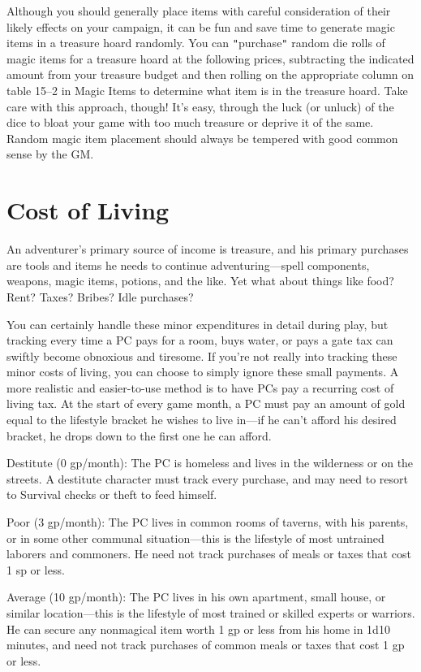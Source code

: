 				
Although you should generally place items with careful consideration of their likely effects on your campaign, it can be fun and save time to generate magic items in a treasure hoard randomly. You can \texttt{{}"{}}purchase\texttt{{}"{}} random die rolls of magic items for a treasure hoard at the following prices, subtracting the indicated amount from your treasure budget and then rolling on the appropriate column on table 15--2 in Magic Items to determine what item is in the treasure hoard. Take care with this approach, though! It's easy, through the luck (or unluck) of the dice to bloat your game with too much treasure or deprive it of the same. Random magic item placement should always be tempered with good common sense by the GM.
								
\section{Cost of Living}

				
An adventurer's primary source of income is treasure, and his primary purchases are tools and items he needs to continue adventuring---spell components, weapons, magic items, potions, and the like. Yet what about things like food? Rent? Taxes? Bribes? Idle purchases?
				
You can certainly handle these minor expenditures in detail during play, but tracking every time a PC pays for a room, buys water, or pays a gate tax can swiftly become obnoxious and tiresome. If you're not really into tracking these minor costs of living, you can choose to simply ignore these small payments. A more realistic and easier-to-use method is to have PCs pay a recurring cost of living tax. At the start of every game month, a PC must pay an amount of gold equal to the lifestyle bracket he wishes to live in---if he can't afford his desired bracket, he drops down to the first one he can afford.
				
Destitute (0 gp/month): The PC is homeless and lives in the wilderness or on the streets. A destitute character must track every purchase, and may need to resort to Survival checks or theft to feed himself.
				
Poor (3 gp/month): The PC lives in common rooms of taverns, with his parents, or in some other communal situation---this is the lifestyle of most untrained laborers and commoners. He need not track purchases of meals or taxes that cost 1 sp or less.
				
Average (10 gp/month): The PC lives in his own apartment, small house, or similar location---this is the lifestyle of most trained or skilled experts or warriors. He can secure any nonmagical item worth 1 gp or less from his home in 1d10 minutes, and need not track purchases of common meals or taxes that cost 1 gp or less.
				
